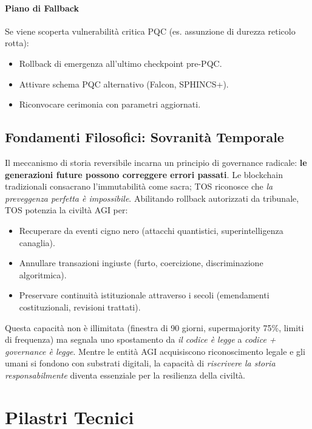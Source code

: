 \documentclass[11pt]{article}
\begin{document}
\paragraph{Piano di Fallback}
Se viene scoperta vulnerabilità critica PQC (es. assunzione di durezza reticolo rotta):
\begin{itemize}[noitemsep]
  \item Rollback di emergenza all'ultimo checkpoint pre-PQC.
  \item Attivare schema PQC alternativo (Falcon, SPHINCS+).
  \item Riconvocare cerimonia con parametri aggiornati.
\end{itemize}

\subsection{Fondamenti Filosofici: Sovranità Temporale}

Il meccanismo di storia reversibile incarna un principio di governance radicale: \textbf{le generazioni future possono correggere errori passati}. Le blockchain tradizionali consacrano l'immutabilità come sacra; TOS riconosce che \emph{la preveggenza perfetta è impossibile}. Abilitando rollback autorizzati da tribunale, TOS potenzia la civiltà AGI per:
\begin{itemize}[noitemsep]
  \item Recuperare da eventi cigno nero (attacchi quantistici, superintelligenza canaglia).
  \item Annullare transazioni ingiuste (furto, coercizione, discriminazione algoritmica).
  \item Preservare continuità istituzionale attraverso i secoli (emendamenti costituzionali, revisioni trattati).
\end{itemize}

Questa capacità non è illimitata (finestra di 90 giorni, supermajority 75\%, limiti di frequenza) ma segnala uno spostamento da \emph{il codice è legge} a \emph{codice + governance è legge}. Mentre le entità AGI acquisiscono riconoscimento legale e gli umani si fondono con substrati digitali, la capacità di \emph{riscrivere la storia responsabilmente} diventa essenziale per la resilienza della civiltà.

\section{Pilastri Tecnici}
\end{document}
